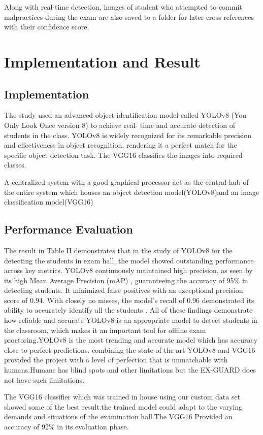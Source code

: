 \documentclass[conference]{IEEEtran}
\begin{document}
 Along with real-time detection, images of student who attempted to commit malpractices during the exam are also saved to a folder for later cross references with their confidence score.

\section{Implementation and Result}
\subsection{Implementation}
The study used an advanced object identification model called YOLOv8 (You Only Look Once version 8) to achieve real- time and accurate detection of students in the class. YOLOv8 is widely recognized for its remarkable precision and effectiveness in object recognition, rendering it a perfect match for the specific object detection task. The VGG16 classifies the images into required classes.

A centralized system with a good graphical processor act as the central hub of the entire system which houses an object detection model(YOLOv8)and an image classification model(VGG16)

\subsection{Performance Evaluation}
The result in Table II demonstrates that in the study of YOLOv8 for the detecting the students in exam hall, the model showed outstanding performance across key metrics.
YOLOv8 continuously maintained high precision, as seen by its high Mean Average Precision (mAP) , guaranteeing the accuracy of 95\% in detecting students. It minimized false positives with an exceptional precision score of 0.94. With closely no misses, the model’s recall of 0.96 demonstrated its ability to accurately identify all the  students .
All of these findings demonstrate how reliable and accurate YOLOv8 is an appropriate model to detect students in the classroom, which makes it an important tool for offline exam proctoring.YOLOv8 is the most trending and accurate model which has accuracy close to perfect predictions. combining the state-of-the-art YOLOv8 and VGG16 provided the project with a level of perfection that is unmatchable with humans.Humans has blind spots and other limitations but the EX-GUARD does not have such limitations.

The VGG16 classifier which was trained in house using our custom data set showed some of the best result.the trained model could adapt to the varying demands and situations of the examination hall.The VGG16 Provided an accuracy of 92\% in its evaluation phase.
\end{document}
